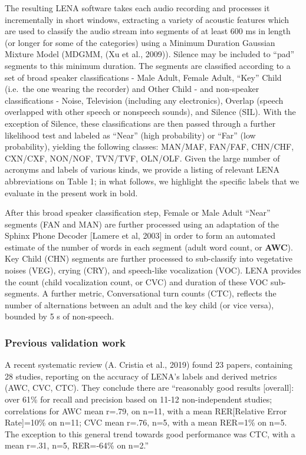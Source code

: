 \documentclass[english,floatsintext,man]{apa6}
\begin{document}
The resulting LENA software takes each audio recording and processes it
incrementally in short windows, extracting a variety of acoustic
features which are used to classify the audio stream into segments of at
least 600 ms in length (or longer for some of the categories) using a
Minimum Duration Gaussian Mixture Model (MDGMM, (Xu et al., 2009)).
Silence may be included to \enquote{pad} segments to this minimum
duration. The segments are classified according to a set of broad
speaker classifications - Male Adult, Female Adult, \enquote{Key} Child
(i.e.~the one wearing the recorder) and Other Child - and non-speaker
classifications - Noise, Television (including any electronics), Overlap
(speech overlapped with other speech or nonspeech sounds), and Silence
(SIL). With the exception of Silence, these classifications are then
passed through a further likelihood test and labeled as \enquote{Near}
(high probability) or \enquote{Far} (low probability), yielding the
following classes: MAN/MAF, FAN/FAF, CHN/CHF, CXN/CXF, NON/NOF, TVN/TVF,
OLN/OLF. Given the large number of acronyms and labels of various kinds,
we provide a listing of relevant LENA abbreviations on Table 1; in what
follows, we highlight the specific labels that we evaluate in the
present work in bold.

After this broad speaker classification step, Female or Male Adult
\enquote{Near} segments (FAN and MAN) are further processed using an
adaptation of the Sphinx Phone Decoder {[}Lamere et al, 2003{]} in order
to form an automated estimate of the number of words in each segment
(adult word count, or \textbf{AWC}). Key Child (CHN) segments are
further processed to sub-classify into vegetative noises (VEG), crying
(CRY), and speech-like vocalization (VOC). LENA provides the count
(child vocalization count, or CVC) and duration of these VOC
sub-segments. A further metric, Conversational turn counts (CTC),
reflects the number of alternations between an adult and the key child
(or vice versa), bounded by 5 s of non-speech.

\subsubsection{Previous validation work}\label{previous-validation-work}

A recent systematic review (A. Cristia et al., 2019) found 23 papers,
containing 28 studies, reporting on the accuracy of LENA's labels and
derived metrics (AWC, CVC, CTC). They conclude there are
\enquote{reasonably good results {[}overall{]}: over 61\% for recall and
precision based on 11-12 non-independent studies; correlations for AWC
mean r=.79, on n=11, with a mean RER{[}Relative Error Rate{]}=10\% on
n=11; CVC mean r=.76, n=5, with a mean RER=1\% on n=5. The exception to
this general trend towards good performance was CTC, with a mean r=.31,
n=5, RER=-64\% on n=2.}
\end{document}
